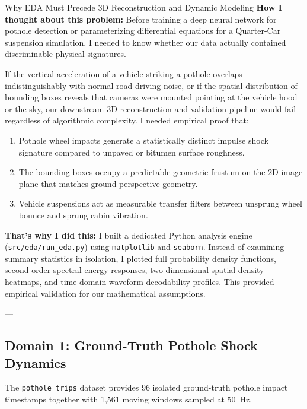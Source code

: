 \begin{designreflection}{Why EDA Must Precede 3D Reconstruction and Dynamic Modeling}
\textbf{How I thought about this problem:}
Before training a deep neural network for pothole detection or parameterizing differential equations for a Quarter-Car suspension simulation, I needed to know whether our data actually contained discriminable physical signatures. 

If the vertical acceleration of a vehicle striking a pothole overlaps indistinguishably with normal road driving noise, or if the spatial distribution of bounding boxes reveals that cameras were mounted pointing at the vehicle hood or the sky, our downstream 3D reconstruction and validation pipeline would fail regardless of algorithmic complexity. I needed empirical proof that:
\begin{enumerate}
    \item Pothole wheel impacts generate a statistically distinct impulse shock signature compared to unpaved or bitumen surface roughness.
    \item The bounding boxes occupy a predictable geometric frustum on the 2D image plane that matches ground perspective geometry.
    \item Vehicle suspensions act as measurable transfer filters between unsprung wheel bounce and sprung cabin vibration.
\end{enumerate}

\textbf{That's why I did this:}
I built a dedicated Python analysis engine (\texttt{src/eda/run\_eda.py}) using \texttt{matplotlib} and \texttt{seaborn}. Instead of examining summary statistics in isolation, I plotted full probability density functions, second-order spectral energy responses, two-dimensional spatial density heatmaps, and time-domain waveform decodability profiles. This provided empirical validation for our mathematical assumptions.
\end{designreflection}

---

\subsection{Domain 1: Ground-Truth Pothole Shock Dynamics}
The \texttt{pothole\_trips} dataset provides 96 isolated ground-truth pothole impact timestamps together with 1,561 moving windows sampled at 50~Hz. 

